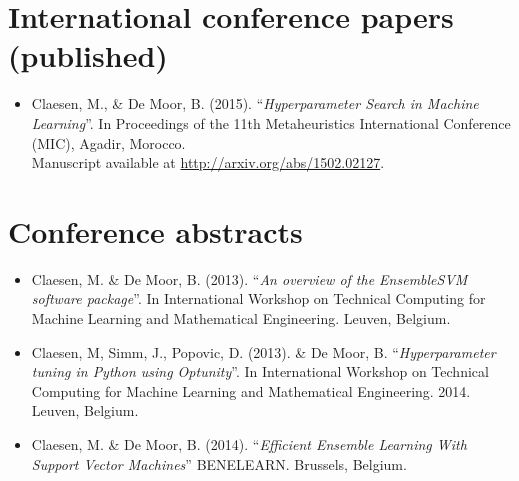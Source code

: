\section*{International conference papers (published)}
\begin{itemize}
\item Claesen, M., \& De Moor, B. (2015). ``\emph{Hyperparameter Search in Machine Learning}''. In Proceedings of the 11th Metaheuristics International Conference (MIC), Agadir, Morocco. \\ Manuscript available at \url{http://arxiv.org/abs/1502.02127}.
\end{itemize}

\section*{Conference abstracts}
\begin{itemize}
\item Claesen, M. \& De Moor, B. (2013). ``\emph{An overview of the EnsembleSVM software package}''. In International Workshop on Technical Computing for Machine Learning and Mathematical Engineering. Leuven, Belgium.
\item Claesen, M, Simm, J., Popovic, D. (2013). \& De Moor, B. ``\emph{Hyperparameter tuning in Python using Optunity}''. In International Workshop on Technical Computing for Machine Learning and Mathematical Engineering. 2014. Leuven, Belgium.
\item Claesen, M. \& De Moor, B. (2014). ``\emph{Efficient Ensemble Learning With Support Vector Machines}'' BENELEARN. Brussels, Belgium.
\end{itemize}




